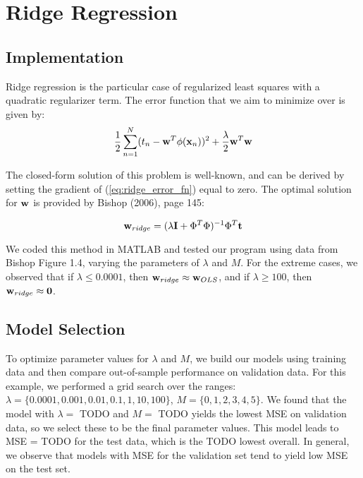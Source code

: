 
\section{Ridge Regression}\label{sec:ridge_reg}
\subsection{Implementation}
Ridge regression is the particular case of regularized least squares with a quadratic regularizer term.  The error function that we aim to minimize over is given by:
\begin{equation} \label{eq:ridge_error_fn}
\frac{1}{2} \sum_{n=1}^{N} (t_n - \boldsymbol{\mathbf{w}}^T \phi (\boldsymbol{\mathbf{x}}_n) )^2 + \frac{\lambda}{2} \boldsymbol{\mathbf{w}}^T \boldsymbol{\mathbf{w}}
\end{equation}

The closed-form solution of this problem is well-known, and can be derived by setting the gradient of (\ref{eq:ridge_error_fn}) equal to zero.  The optimal solution for $\boldsymbol{\mathbf{w}}$ is provided by Bishop (2006), page 145:

\begin{equation} \label{eq:ridge_sol}
\boldsymbol{\mathbf{w}}_{ridge} = (\lambda \boldsymbol{\mathbf{I}} + \Phi^T \Phi)^{-1} \Phi^T \boldsymbol{\mathbf{t}}
\end{equation}

We coded this method in MATLAB and tested our program using data from Bishop Figure 1.4, varying the parameters of $\lambda$ and $M$.  For the extreme cases, we observed that if $\lambda \leq 0.0001$, then $\boldsymbol{\mathbf{w}}_{ridge} \approx \boldsymbol{\mathbf{w}}_{OLS}$, and if $\lambda \geq 100$, then $\boldsymbol{\mathbf{w}}_{ridge} \approx \boldsymbol{\mathbf{0}}$.



\subsection{Model Selection}
To optimize parameter values for $\lambda$ and $M$, we build our models using training data and then compare out-of-sample performance on validation data.  For this example, we performed a grid search over the ranges: $\lambda = \{0.0001, 0.001, 0.01, 0.1,1,10,100\}$, $M = \{0,1,2,3,4,5\}$.  We found that the model with $\lambda = $ TODO and $M = $ TODO yields the lowest MSE on validation data, so we select these to be the final parameter values.  This model leads to MSE = TODO for the test data, which is the TODO lowest overall.  In general, we observe that models with MSE for the validation set tend to yield low MSE on the test set.  

